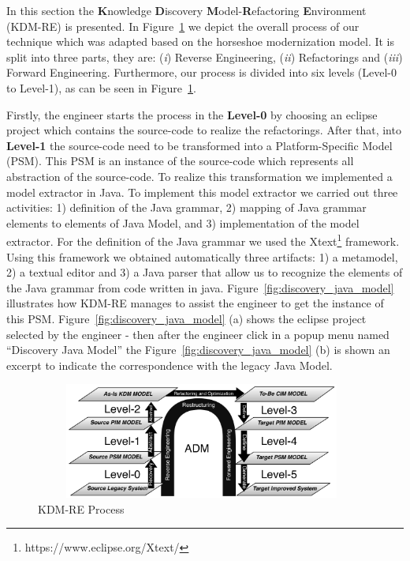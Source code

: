 In this section the \textbf{K}nowledge \textbf{D}iscovery \textbf{M}odel-\textbf{R}efactoring \textbf{E}nvironment (KDM-RE) is presented. 
In Figure~\ref{fig:process} we depict the overall process of our technique which was adapted based on the horseshoe modernization model. 
It is split into three parts, they are: 
(\textit{i}) Reverse Engineering, 
(\textit{ii}) Refactorings and 
(\textit{iii}) Forward Engineering. 
Furthermore, our process is divided into six levels (Level-0 to Level-1), as can be seen in Figure~\ref{fig:process}. 

Firstly, the engineer starts the process in the \textbf{Level-0} by choosing an eclipse project which contains the source-code to realize the refactorings.  
After that, into \textbf{Level-1} the source-code need to be transformed into a Platform-Specific Model (PSM). 
This PSM is an instance of the source-code which represents all abstraction of the source-code. To realize this transformation we implemented a model extractor in Java. To implement this model extractor we carried out three activities: 1) definition of the Java grammar, 2) mapping of Java grammar elements to elements of Java Model, and 3) implementation of the model extractor. For the definition of the Java grammar we used the Xtext\footnote{https://www.eclipse.org/Xtext/} framework. Using this framework we obtained automatically three artifacts: 1) a metamodel, 2) a textual editor and 3) a Java parser that allow us to recognize the elements of the Java grammar from code written in java. 
Figure~\ref{fig:discovery_java_model} illustrates how KDM-RE manages to assist the engineer to get the instance of this PSM. Figure~\ref{fig:discovery_java_model} (a) shows the eclipse project selected by the engineer - then after the engineer click in a popup menu named ``Discovery Java Model'' the Figure~\ref{fig:discovery_java_model} (b) is shown an excerpt to indicate the correspondence with the legacy Java Model.

\begin{figure}[!ht]
\centering
  \includegraphics[width=11cm, height=3.8cm]{figure/processoDaFerramenta}
\caption{KDM-RE Process}
\label{fig:process}
\end{figure} 

